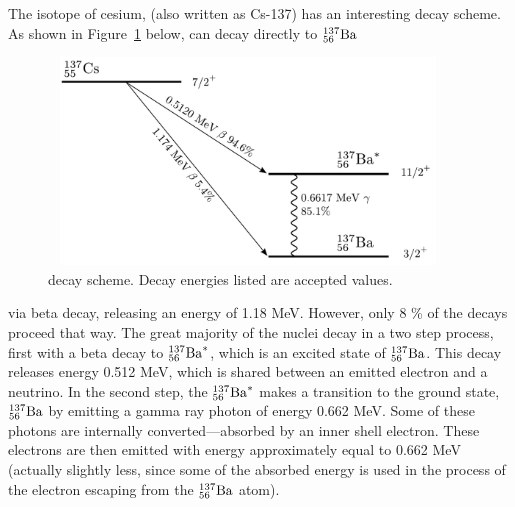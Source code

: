 \bigskip

The isotope of cesium,
\cs
(also written as Cs-137) has an interesting decay scheme.  As shown in
Figure~\ref{fig:csdecay} below, \cs can decay directly to
${}^{137}_{56}{\rm Ba}$
\begin{figure}
\begin{centering}
\includegraphics[width=4.1661in,height=2.1661in]{../images/Cs-137-decay.pdf}
\caption{ \cs decay scheme.  Decay energies listed are accepted values. }
\label{fig:csdecay}
\end{centering}
\end{figure}
via beta decay, releasing an energy of 1.18 MeV.  However, only 8 \%
of the decays proceed that way.  The great majority of the \cs
nuclei decay in a two step process, first with a beta decay to ${}^{137}_{56}{\rm Ba}^*$,
which is an excited state of
${}^{137}_{56}{\rm Ba}$.
This decay releases energy 0.512 MeV, which is shared between an
emitted electron and a neutrino. In the second step, the ${}^{137}_{56}{\rm Ba}^*$ makes
a transition to the ground state, ${}^{137}_{56}{\rm Ba}$ by emitting a gamma ray photon
of energy 0.662 MeV.  Some of these photons are internally
converted---absorbed by an inner shell electron.  These electrons are
then emitted with energy approximately equal to 0.662 MeV
(actually slightly less, since some of the absorbed energy is used in
the process of the electron escaping from the ${}^{137}_{56}{\rm Ba}$ atom).

